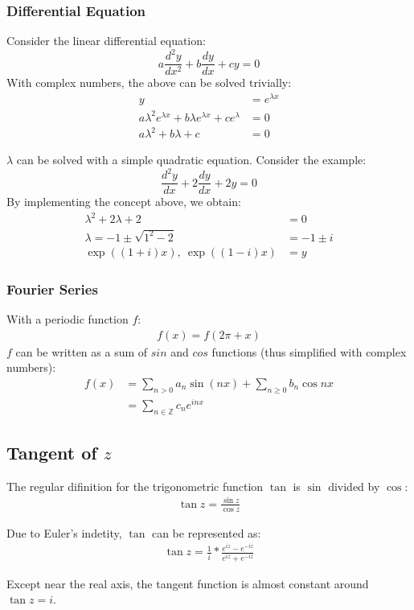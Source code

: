\documentclass[12pt]{article}
\begin{document}
	\subsubsection{Differential Equation}
	
	Consider the linear differential equation: $$a\frac{d^2y}{dx^2} + b\frac{dy}{dx} + cy = 0$$
	With complex numbers, the above can be solved trivially:
	\begin{align*}
		y &= e^{\lambda x} \\
		a\lambda^2e^{\lambda x} + b\lambda e^{\lambda x} + ce^\lambda &= 0 \\
		a \lambda^2 + b\lambda + c &= 0
	\end{align*}
	
	$\lambda$ can be solved with a simple quadratic equation. Consider the example: $$\frac{d^2 y}{dx} + 2\frac{dy}{dx} + 2y = 0$$
	By implementing the concept above, we obtain:
	\begin{align*}
		\lambda^2 + 2\lambda + 2 &= 0 \\
		\lambda = -1 \pm \sqrt{1^2 - 2} &= -1 \pm i \\
		\exp((1 + i)x),\ \exp((1 - i)x) &= y
	\end{align*}
	
	\subsubsection{Fourier Series}
	
	With a periodic function $f$: 
	\begin{gather*}
		f(x) = f(2\pi + x)
	\end{gather*}
	$f$ can be written as a sum of $sin$ and $cos$ functions (thus simplified with complex numbers):
	\begin{align*}
		f(x) &= \sum_{n > 0} a_n \sin(nx) + \sum_{n \geq 0} b_n \cos{nx} \\
		&= \sum_{n \in \mathbb{Z}} c_n e^{inx}
	\end{align*}
	
	\subsection{Tangent of $z$}
	
	The regular difinition for the trigonometric function $\tan$ is $\sin$ divided by $\cos$:
	\begin{gather*}
		\tan z = \frac{\sin z}{\cos z}
	\end{gather*}
	
	Due to Euler's indetity, $\tan$ can be represented as:
	\begin{gather*}
		\tan z = \frac{1}{i} * \frac{e^{iz} - e^{-iz}}{e^{iz} + e^{-iz}}
	\end{gather*}
	
	Except near the real axis, the tangent function is almost constant around $\tan z = i$.
	
\end{document}
